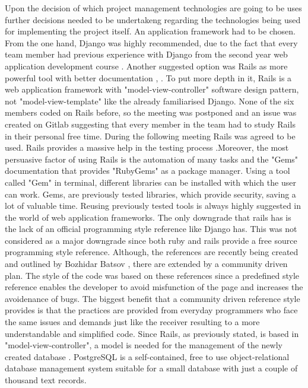 \documentclass{l3proj}
\begin{document}
Upon the decision of which project management technologies are going to be uses further decisions needed to be undertakeng regarding the technologies being used for implementing the project itself. An application framework had to be chosen. From the one hand, Django was highly recommended, due to the fact that every team member had previous experience with Django from the second year web application development course \cite{Django}. Another suggested option was Rails as more powerful tool with better documentation \cite{Rails}, \cite{DjangoVsRails} . To put more depth in it, Rails is a web application framework with "model-view-controller" software design pattern, not "model-view-template" like the already familiarised Django. None of the six members coded on Rails before, so the meeting was postponed and an issue was created on Gitlab suggesting that every member in the team had to study Rails in their personal free time. During the following meeting Rails was agreed to be used. Rails provides a massive help in the testing process \cite{RubyGem} .Moreover, the most persuasive factor of using Rails is the automation of many tasks and the "Gems" documentation that provides "RubyGems" as a package manager. Using a tool called "Gem" in  terminal, different libraries can be installed with which the user can work. Gems, are previously tested libraries, which provide security, saving a lot of valuable time. Reusing previously tested tools is always highly suggested in the world of web application frameworks. The only downgrade that rails has is the lack of an official programming style reference like Django has. This was not considered as a major downgrade since both ruby \cite{rubyStyle} and rails \cite{railsStyle} provide a free source programming style reference. Although, the references are recently being created and outlined by Bozhidar Batsov \cite{batsov}, there are extended by a community driven plan. The style of the code was based on these references since a predefined style reference enables the developer to avoid misfunction of the page and increases the avoidenance of bugs. The biggest benefit that a community driven reference style provides is that the practices are provided from everyday programmers who face the same issues and demands just like the receiver resulting to a more understandable and simplified code. Since Rails, as previously stated, is based in "model-view-controller", a model is needed for the management of the newly created database \cite{PostgreSQL}. PostgreSQL is a self-contained, free to use object-relational database management system suitable for a small database with just a couple of thousand text records.
\end{document}
